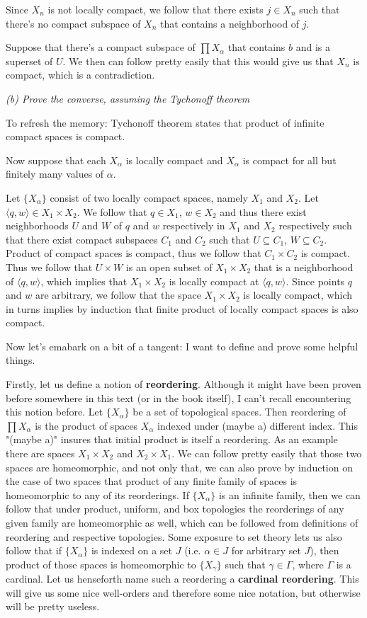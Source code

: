\documentclass[11pt,oneside,titlepage]{book}
\newcommand{\eangle}[1]{\langle #1 \rangle}
\newcommand{\set}[1]{\{ #1 \}}
\begin{document}
Since $X_n$ is not locally compact, we follow that there exists $j \in X_n$ such that
there's no compact subspace of $X_n$ that contains a neighborhood of $j$.

Suppose that there's a compact subspace of $\prod{X_\alpha}$ that contains
$b$ and is a superset of $U$. We then can follow pretty easily
that this would give us that $X_n$ is compact, which is a contradiction.

\textit{(b) Prove the converse, assuming the Tychonoff theorem}

To refresh the memory: Tychonoff theorem states that product of infinite compact spaces
is compact.

Now suppose that each $X_\alpha$ is locally compact and $X_\alpha$ is compact for all but
finitely many values of $\alpha$.

Let $\set{X_\alpha}$ consist of two locally compact spaces, namely $X_1$ and $X_2$.
Let $\eangle{q, w} \in X_1 \times X_2$. We follow that $q \in X_1$, $w \in X_2$ and
thus there exist neighborhoods $U$ and $W$ of $q$ and $w$ respectively in $X_1$ and
$X_2$ respectively such that there exist compact subspaces $C_1$ and $C_2$
such that $U \subseteq C_1$, $W \subseteq C_2$. Product of compact spaces is compact, thus
we follow that $C_1 \times C_2$ is compact. Thus we follow that $U \times W$ is an open
subset of $X_1 \times X_2$ that is a neighborhood of $\eangle{q, w}$, which implies that
$X_1 \times X_2$ is locally compact at $\eangle{q, w}$. Since points $q$ and $w$ are
arbitrary, we follow that the space $X_1 \times X_2$ is locally compact, which in turns
implies by induction that finite product of locally compact spaces is also compact.

Now let's emabark on a bit of a tangent: I want to define and prove some helpful things.

Firstly, let us define a notion of \textbf{reordering}.  Although it might have been proven before
somewhere in this text (or in the book itself), I can't recall encountering this notion before.
Let $\set{X_\alpha}$ be a set of topological spaces. Then reordering of $\prod{X_\alpha}$ is
the product of spaces $X_\alpha$ indexed under (maybe a) different index. This "(maybe a)"
insures that initial product is itself a reordering. As an example there are
spaces $X_1 \times X_2$ and $X_2 \times X_1$. We can follow pretty easily that those
two spaces are homeomorphic, and not only that, we can also prove by induction on the case
of two spaces that product of any finite family of spaces is homeomorphic to any of its
reorderings.
If $\set{X_\alpha}$ is an infinite family, then we can follow that under product, uniform,
and box topologies the reorderings of any given family are homeomorphic as well, which can 
be followed from definitions of reordering and respective topologies.
Some exposure to set theory lets us also follow that if $\set{X_\alpha}$ is indexed on a set $J$
(i.e. $\alpha \in J$ for arbitrary set $J$), then product of those spaces is
homeomorphic to $\set{X_\gamma}$ such
that $\gamma \in \Gamma$, where $\Gamma$ is a cardinal. Let us henseforth name such a reordering
a \textbf{cardinal reordering}. This will give us some nice well-orders and therefore
some nice notation, but otherwise will be pretty useless.
\end{document}
